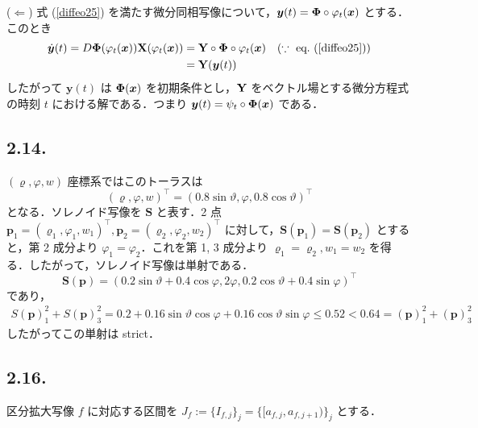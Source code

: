\documentclass[a4paper,11pt,uplatex]{jsarticle}
\begin{document}
($\Leftarrow$) 式 (\ref{diffeo25}) を満たす微分同相写像について，${\bm y}(t) = {\bf \Phi}\circ {\varphi}_t ({\bm x})$ とする．このとき
\begin{align}
    \dot{\bm y}(t) = D{\bf \Phi}({\varphi}_t({\bm x})){\bf X}({\varphi}_t({\bm x})) &= {\bf Y}\circ {\bf \Phi} \circ {\varphi}_t ({\bm x}) \quad (\because \ \text{eq.~}(\ref{diffeo25})) \nonumber \\
    &= {\bf Y}({\bm y}(t))
\end{align}
したがって ${\bm y}(t)$ は ${\bf \Phi}({\bm x})$ を初期条件とし，${\bf Y}$ をベクトル場とする微分方程式の時刻 $t$ における解である．つまり ${\bm y} (t)= {\psi}_t \circ {\bf \Phi}({\bm x})$ である．

\subsection{2.14.}
$(\varrho,\varphi,w)$ 座標系ではこのトーラスは
\begin{equation}
    (\varrho,\varphi,w)^\top = (0.8\sin{\vartheta},\varphi,0.8\cos{\vartheta})^\top
\end{equation}
となる．ソレノイド写像を ${\bm S}$ と表す．2 点 ${\bm p}_1 = (\varrho_1,\varphi_1,w_1)^\top, {\bm p}_2 = (\varrho_2,\varphi_2,w_2)^\top$ に対して，${\bm S}({\bm p}_1) = {\bm S}({\bm p}_2) $ とすると，第 2 成分より $\varphi_1=\varphi_2$．これを第 1, 3 成分より $\varrho_1=\varrho_2, w_1 = w_2$ を得る．したがって，ソレノイド写像は単射である．
\begin{equation}
    {\bm S}({\bm p})= (0.2\sin{\vartheta}+0.4\cos{\varphi},2\varphi,0.2\cos{\vartheta}+0.4\sin{\varphi})^\top
\end{equation}
であり，
\begin{align}
    S({\bm p})_1^2+S({\bm p})_3^2 = 0.2+0.16\sin{\vartheta}\cos{\varphi}+0.16\cos{\vartheta}\sin{\varphi} \le 0.52 < 0.64 = ({\bm p})_1^2+({\bm p})_3^2
\end{align}
したがってこの単射は strict．

\subsection{2.16.}
区分拡大写像 $f$ に対応する区間を $J_f := \{I_{f,j}\}_j = \{[a_{f,j},a_{f,j+1})\}_j$ とする．
\end{document}
